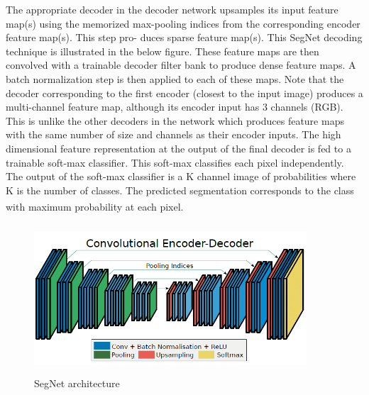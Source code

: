 The appropriate decoder in the decoder network upsamples its input feature map(s) using the memorized max-pooling indices from the corresponding encoder feature map(s). This step pro- duces sparse feature map(s). This SegNet decoding technique is illustrated in the below figure.
These feature maps are then convolved with a trainable decoder filter bank to produce dense feature maps. A batch normalization step is then applied to each of these maps. Note that the decoder corresponding to the first encoder (closest to the input image) produces a multi-channel feature map, although its encoder input has 3 channels (RGB).
This is unlike the other decoders in the network which produces feature maps with the same number of size and channels as their encoder inputs. The high dimensional feature representation at the output of the final decoder is fed to a trainable soft-max classifier.
This soft-max classifies each pixel independently. The output of the soft-max classifier is a K channel image of probabilities where K is the number of classes. The predicted segmentation corresponds to the class with maximum probability at each pixel. \textsuperscript{\cite{badrinarayanan2017segnet}}

\vspace{0.2in}

\begin{figure}[H]
\centering
  \vspace{-0.1in}
    \centerline{\includegraphics[width = 4in, height = 2.2in]{../images/segnet.png}}
    \caption{SegNet architecture}
\end{figure}


